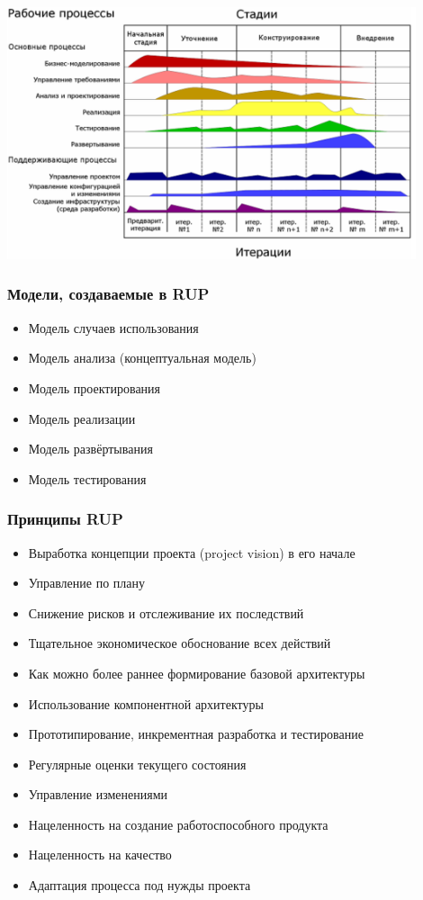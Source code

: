 \documentclass{../../slides-style}
\begin{document}
    \begin{frame}
        \begin{center}
            \includegraphics[width=0.9\textwidth]{rupProcesses.png}
        \end{center}
    \end{frame}

    \begin{frame}
        \frametitle{Модели, создаваемые в RUP}
        \begin{itemize}
            \item Модель случаев использования
            \item Модель анализа (концептуальная модель)
            \item Модель проектирования
            \item Модель реализации
            \item Модель развёртывания
            \item Модель тестирования
        \end{itemize}
    \end{frame}

    \begin{frame}
        \frametitle{Принципы RUP}
        \begin{itemize}
            \item Выработка концепции проекта (project vision) в его начале
            \item Управление по плану
            \item Снижение рисков и отслеживание их последствий
            \item Тщательное экономическое обоснование всех действий
            \item Как можно более раннее формирование базовой архитектуры
            \item Использование компонентной архитектуры
            \item Прототипирование, инкрементная разработка и тестирование
            \item Регулярные оценки текущего состояния
            \item Управление изменениями
            \item Нацеленность на создание работоспособного продукта
            \item Нацеленность на качество
            \item Адаптация процесса под нужды проекта
        \end{itemize}
    \end{frame}
\end{document}
